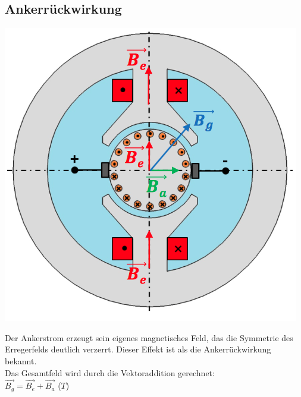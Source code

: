 \subsection{Ankerrückwirkung}
\begin{minipage}{0.4 \linewidth}
\includegraphics[width = \linewidth]{./Pics/VL45/Ankerruek}
\end{minipage}
\begin{minipage}{0.6 \linewidth}
Der Ankerstrom erzeugt sein eigenes magnetisches Feld, das die Symmetrie des Erregerfelds deutlich verzerrt. Dieser Effekt ist als die Ankerrückwirkung bekannt. \\

Das Gesamtfeld wird durch die Vektoraddition gerechnet: \\

$\vec{B_g} = \vec{B_e} + \vec{B_a}$ ($T$)
\end{minipage}

